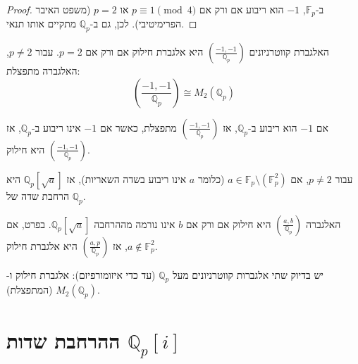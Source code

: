 \documentclass{tstextbook}
\begin{document}
\begin{proof}
ב-\(\mathbb{F}_p\), \(-1\) הוא ריבוע אם ורק אם \(p \equiv 1 \pmod{4}\) או \(p=2\) (משפט האיבר הפרימיטיבי). לכן, גם ב-\(\mathbb{Q}_p\) מתקיים אותו תנאי.

\end{proof}
\begin{proposition}
האלגברת קווטרניונים \(\left(\frac{-1,-1}{\mathbb{Q}_p}\right)\) היא אלגברת חילוק אם ורק אם \(p=2\). עבור \(p \neq 2\), האלגברה מתפצלת: 
$$\left(\frac{-1,-1}{\mathbb{Q}_p}\right) \cong M_2(\mathbb{Q}_p)$$

\end{proposition}
\begin{proposition}
אם \(-1\) הוא ריבוע ב-\(\mathbb{Q}_p\), אז \(\left(\frac{-1,-1}{\mathbb{Q}_p}\right)\) מתפצלת, כאשר אם \(-1\) אינו ריבוע ב-\(\mathbb{Q}_p\), אז \(\left(\frac{-1,-1}{\mathbb{Q}_p}\right)\) היא חילוק.

\end{proposition}
\begin{proposition}
עבור \(p \neq 2\), אם \(a \in \mathbb{F}_p \setminus (\mathbb{F}_p^2)\) (כלומר \(a\) אינו ריבוע בשדה השאריות), אז \(\mathbb{Q}_p[\sqrt{a}]\) היא הרחבת שדה של \(\mathbb{Q}_p\).

\end{proposition}
\begin{proposition}
האלגברה \(\left(\frac{a,b}{\mathbb{Q}_p}\right)\) היא חילוק אם ורק אם \(b\) אינו נורמה מההרחבה \(\mathbb{Q}_p[\sqrt{a}]\). בפרט, אם \(a \notin \mathbb{F}_p^2\), אז \(\left(\frac{a,p}{\mathbb{Q}_p}\right)\) היא אלגברת חילוק.

\end{proposition}
\begin{corollary}
יש בדיוק שתי אלגברות קווטרניונים מעל \(\mathbb{Q}_p\) (עד כדי איזומורפיזם): אלגברת חילוק ו-\(M_2(\mathbb{Q}_p)\) (המתפצלת).

\end{corollary}
\section{ההרחבת שדות \(\mathbb{Q}_{p}[i]\)}
\end{document}
